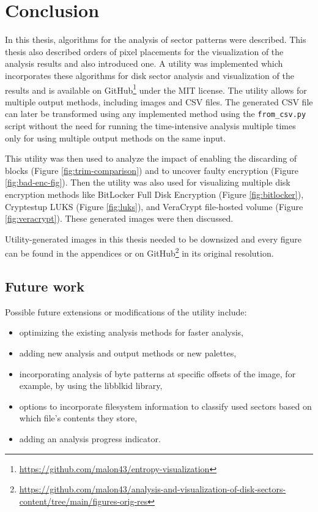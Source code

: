 \documentclass[
  digital, %
  color,   %
  oneside, %
  lof,     %
  nolot,     %
]{fithesis4}
\begin{document}
\chapter{Conclusion}
\label{chap:conclusion}

In this thesis, algorithms for the analysis of sector patterns were described.
This thesis also described orders of pixel placements for the visualization of the analysis results and also introduced one.
A utility was implemented which incorporates these algorithms for disk sector analysis and visualization of the results and is available on GitHub\footnote{\url{https://github.com/malon43/entropy-visualization}} under the MIT license.
The utility allows for multiple output methods, including images and CSV files.
The generated CSV file can later be transformed using any implemented method using the \texttt{from\_csv.py} script without the need for running the time-intensive analysis multiple times only for using multiple output methods on the same input. 

This utility was then used to analyze the impact of enabling the discarding of blocks (Figure \ref{fig:trim-comparison}) and to uncover faulty encryption (Figure \ref{fig:bad-enc-fig}).
Then the utility was also used for visualizing multiple disk encryption methods like BitLocker Full Disk Encryption (Figure \ref{fig:bitlocker}), Cryptestup LUKS (Figure \ref{fig:luks}), and VeraCrypt file-hosted volume (Figure \ref{fig:veracrypt}).
These generated images were then discussed. 

Utility-generated images in this thesis needed to be downsized and every figure can be found in the appendices or on GitHub\footnote{\url{https://github.com/malon43/analysis-and-visualization-of-disk-sectors-content/tree/main/figures-orig-res}} in its original resolution.

\section{Future work}
\label{sec:future-work}

Possible future extensions or modifications of the utility include:
\begin{itemize}
  \item optimizing the existing analysis methods for faster analysis,
  \item adding new analysis and output methods or new palettes,
  \item incorporating analysis of byte patterns at specific offsets of the image, for example, by using the libblkid library\cite{libblkid},
  \item options to incorporate filesystem information to classify used sectors based on which file's contents they store,
  \item adding an analysis progress indicator.
\end{itemize}
\end{document}
